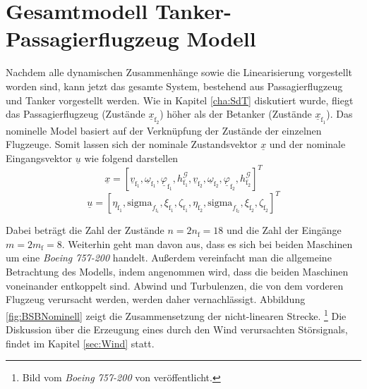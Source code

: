 \chapter{Gesamtmodell Tanker-Passagierflugzeug Modell}\label{cha:ZweiFlieger}
Nachdem alle dynamischen Zusammenhänge sowie die Linearisierung vorgestellt worden sind, kann jetzt das gesamte System, bestehend aus Passagierflugzeug und Tanker vorgestellt werden. Wie in Kapitel \ref{cha:SdT} diskutiert wurde, fliegt das Passagierflugzeug (Zustände $\underline{x}_\mathrm{f_2}$) höher als der Betanker (Zustände $\underline{x}_\mathrm{f_1}$). Das nominelle Model basiert auf der Verknüpfung der Zustände der einzelnen Flugzeuge. Somit lassen sich der nominale Zustandsvektor $\underline{x}$ und der nominale Eingangsvektor $\underline{u}$ wie folgend darstellen
\begin{equation}
\underline{x} = [
\underline{v}_\mathrm{f_1},\underline{\omega}_\mathrm{f_1},\underline{\varphi}_\mathrm{f_1},h^\mathcal{G}_\mathrm{f_1},
\underline{v}_\mathrm{f_2},\underline{\omega}_\mathrm{f_2},\underline{\varphi}_\mathrm{f_2},h^\mathcal{G}_\mathrm{f_2}]^T
\end{equation}
\begin{equation}
\underline{u} = [ \eta_\mathrm{f_1},\mathrm{sigma}_{f_\mathrm{f_1}}, \xi_\mathrm{f_1} , \zeta_\mathrm{f_1}, \eta_\mathrm{f_2},\mathrm{sigma}_{f_\mathrm{f_2}}, \xi_\mathrm{f_2} , \zeta_\mathrm{f_2}]^T
\end{equation}

Dabei beträgt die Zahl der Zustände $n = 2n_\mathrm{f} = 18$ und die Zahl der Eingänge $m = 2m_\mathrm{f} = 8$. Weiterhin geht man davon aus, dass es sich bei beiden Maschinen um eine \textit{Boeing 757-200} handelt. Au{\ss}erdem vereinfacht man die allgemeine Betrachtung des Modells, indem angenommen wird, dass die beiden Maschinen voneinander entkoppelt sind. Abwind und Turbulenzen, die von dem vorderen Flugzeug verursacht werden, werden daher vernachlässigt. Abbildung \ref{fig:BSBNominell} zeigt die Zusammensetzung der nicht-linearen Strecke. \footnote{Bild vom  \textit{Boeing 757-200} von \cite{PicBoeing757} veröffentlicht.} Die Diskussion über die Erzeugung eines durch den Wind verursachten Störsignals, findet im Kapitel \ref{sec:Wind} statt.

